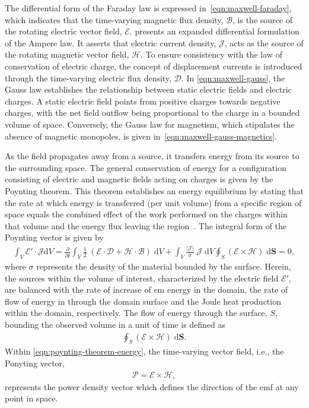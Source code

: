 The differential form of the Faraday law is expressed in~\cref{eqn:maxwell-faraday}, which indicates that the time-varying magnetic flux density, $\mathcal{B}$, is the source of the rotating electric vector field, $\mathcal{E}$.
 presents an expanded differential formulation of the Ampere law.
It asserts that electric current density, $\mathcal{J}$, acts as the source of the rotating magnetic vector field, $\mathcal{H}$.
To ensure consistency with the law of conservation of electric charge, the concept of displacement currents is introduced through the time-varying electric flux density, $\mathcal{D}$.
In \cref{eqn:maxwell-gauss}, the Gauss law establishes the relationship between static electric fields and electric charges. A static electric field points from positive charges towards negative charges, with the net field outflow being proportional to the charge in a bounded volume of space.
Conversely, the Gauss law for magnetism, which stipulates the absence of magnetic monopoles, is given in~\cref{eqn:maxwell-gauss-magnetics}.

As the field propagates away from a source, it transfers energy from its source to the surrounding space.
The general conservation of energy for a configuration consisting of electric and magnetic fields acting on charges is given by the Poynting theorem.
This theorem establishes an energy equilibrium by stating that the rate at which energy is transferred (per unit volume) from a specific region of space equals the combined effect of the work performed on the charges within that volume and the energy flux leaving the region~\cite{Jackson1998Classical}.
The integral form of the Poynting vector is given by
\begin{align}
    \label{eqn:poynting-theorem}
    \int_{V} \mathcal{E}' \cdot \mathcal{J} \mathrm{d}V = \frac{\partial}{\partial t}\int_V \frac{1}{2} \; \left( \mathcal{E} \cdot \mathcal{D} + \mathcal{H} \cdot \mathcal{B} \right) \; \mathrm{d}V + \int_{V} \frac{\left| \mathcal{J} \right|}{\sigma} \; \mathcal{J} \; \mathrm{d}V \oint_S \left( \mathcal{E} \times \mathcal{H} \right) \; \mathrm{d} \mathbf{S} = 0,
\end{align}
where $\sigma$ represents the density of the material bounded by the surface.
Herein, the sources within the volume of interest, characterized by the electric field $\mathcal{E}'$, are balanced with the rate of increase of \gls{em} energy in the domain, the rate of flow of energy in through the domain surface and the Joule heat production within the domain, respectively.
The flow of energy through the surface, $S$, bounding the observed volume in a unit of time is defined as
\begin{align}
    \label{eqn:poynting-theorem-energy}
    \oint_S \left( \mathcal{E} \times \mathcal{H} \right) \; \mathrm{d} \mathbf{S}.
\end{align}
Within \cref{eqn:poynting-theorem-energy}, the time-varying vector field, i.e., the Ponyting vector,
\begin{align}
    \label{eqn:poynting-vector}
    \mathcal{P} = \mathcal{E} \times \mathcal{H},
\end{align}
represents the power density vector which defines the direction of the \gls{emf} at any point in space.

